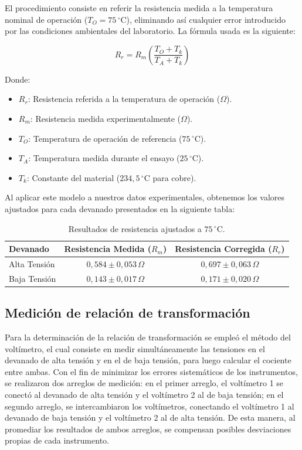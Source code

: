 El procedimiento consiste en referir la resistencia medida a la temperatura nominal de operación ($T_O = 75 \, ^\circ\text{C}$), eliminando así cualquier error introducido por las condiciones ambientales del laboratorio. La fórmula usada es la siguiente:

\begin{equation}
    R_r = R_m \left( \frac{T_O + T_k}{T_A + T_k} \right)
\end{equation}

Donde:
\begin{itemize}
    \item $R_r$: Resistencia referida a la temperatura de operación ($\Omega$).
    \item $R_m$: Resistencia medida experimentalmente ($\Omega$).
    \item $T_O$: Temperatura de operación de referencia ($75 \, ^\circ\text{C}$).
    \item $T_A$: Temperatura medida durante el ensayo ($25 \, ^\circ\text{C}$).
    \item $T_k$: Constante del material ($234,5 \, ^\circ\text{C}$ para cobre).
\end{itemize}

Al aplicar este modelo a nuestros datos experimentales, obtenemos los valores ajustados para cada devanado presentados en la siguiente tabla:

\begin{table}[H]
\centering
\caption{Resultados de resistencia ajustados a $75 \, ^\circ\text{C}$.}
\renewcommand{\arraystretch}{1.3}
\begin{tabular}{lcc}
\toprule
\textbf{Devanado} & \textbf{Resistencia Medida ($R_m$)} & \textbf{Resistencia Corregida ($R_r$)} \\ 
\midrule
Alta Tensión & $0,584 \pm 0,053 \, \Omega$ & $0,697 \pm 0,063 \, \Omega$ \\
Baja Tensión & $0,143 \pm 0,017 \, \Omega$ & $0,171 \pm 0,020 \, \Omega$ \\
\bottomrule
\end{tabular}
\end{table}



\subsection{Medición de relación de transformación}

Para la determinación de la relación de transformación se empleó el método del voltímetro, el cual consiste en medir simultáneamente las tensiones en el devanado de alta tensión y en el de baja tensión, para luego calcular el cociente entre ambas. Con el fin de minimizar los errores sistemáticos de los instrumentos, se realizaron dos arreglos de medición: en el primer arreglo, el voltímetro 1 se conectó al devanado de alta tensión y el voltímetro 2 al de baja tensión; en el segundo arreglo, se intercambiaron los voltímetros, conectando el voltímetro 1 al devanado de baja tensión y el voltímetro 2 al de alta tensión. De esta manera, al promediar los resultados de ambos arreglos, se compensan posibles desviaciones propias de cada instrumento. 

